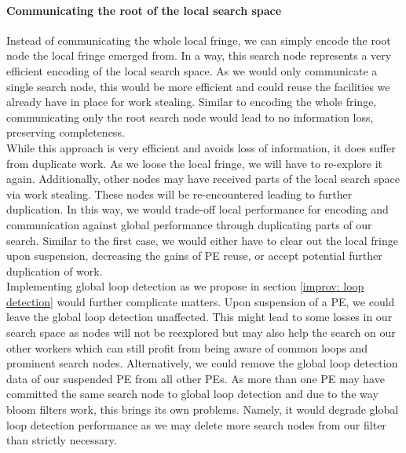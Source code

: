 \paragraph{Communicating the root of the local search space}
Instead of communicating the whole local fringe, we can simply encode the root node the local fringe emerged from. In a way, this search node represents a very efficient encoding of the local search space. As we would only communicate a single search node, this would be more efficient and could reuse the facilities we already have in place for work stealing. Similar to encoding the whole fringe, communicating only the root search node would lead to no information loss, preserving completeness. \\
While this approach is very efficient and avoids loss of information, it does suffer from duplicate work. As we loose the local fringe, we will have to re-explore it again. Additionally, other nodes may have received parts of the local search space via work stealing. These nodes will be re-encountered leading to further duplication. In this way, we would trade-off local performance for encoding and communication against global performance through duplicating parts of our search. Similar to the first case, we would either have to clear out the local fringe upon suspension, decreasing the gains of PE reuse, or accept potential further duplication of work.\\
Implementing global loop detection as we propose in section \ref{improv: loop detection} would further complicate matters. Upon suspension of a PE, we could leave the global loop detection unaffected. This might lead to some losses in our search space as nodes will not be reexplored but may also help the search on our other workers which can still profit from being aware of common loops and prominent search nodes. Alternatively, we could remove the global loop detection data of our suspended PE from all other PEs. As more than one PE may have committed the same search node to global loop detection and due to the way bloom filters work, this brings its own problems. Namely, it would degrade global loop detection performance as we may delete more search nodes from our filter than strictly necessary.
\begin{comment}
- easy and cheap
- duplication of work
- re-exploring things
- nodes that were sent off to other PEs
- how to deal with global loop detection
- delete everything, too conservative, less performance
- do not delete, cut off things wrongly
- restarts deal with this increased false positive rate
\end{comment}

